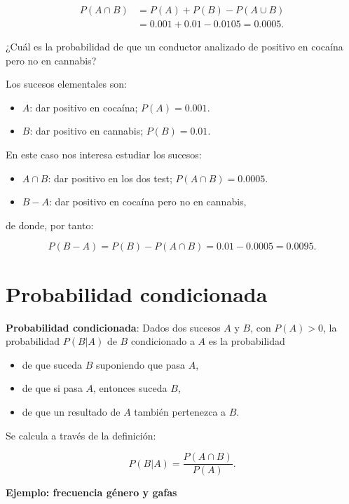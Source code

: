\documentclass[]{book}
\providecommand{\tightlist}{%
  \setlength{\itemsep}{0pt}\setlength{\parskip}{0pt}}
\begin{document}
\[\begin{array}{rl}
{P(A\cap B)} &{=P(A)+P(B)-P(A\cup B)}\\ &{=0.001+0.01-0.0105=0.0005}.
\end{array}\]

¿Cuál es la probabilidad de que un conductor analizado de positivo en cocaína pero no en cannabis?

Los sucesos elementales son:

\begin{itemize}
\tightlist
\item
  \(A\): dar positivo en cocaína; \(P(A)=0.001\).
\item
  \(B\): dar positivo en cannabis; \(P(B)=0.01\).
\end{itemize}

En este caso nos interesa estudiar los sucesos:

\begin{itemize}
\tightlist
\item
  \(A\cap B\): dar positivo en los dos test; \(P(A\cap B)=0.0005\).
\item
  \(B-A\): dar positivo en cocaína pero no en cannabis,
\end{itemize}

de donde, por tanto:

\[P(B-A) =P(B)-P(A\cap B) =0.01-0.0005=0.0095.\]

\hypertarget{probabilidad-condicionada}{%
\section{Probabilidad condicionada}\label{probabilidad-condicionada}}

 \textbf{Probabilidad condicionada}: Dados dos sucesos \(A\) y \(B\), con \(P(A)>0\), la probabilidad \(P(B|A)\) de \(B\) condicionado a \(A\) es la probabilidad

\begin{itemize}
\tightlist
\item
  de que suceda \(B\) suponiendo que pasa \(A\),
\item
  de que si pasa \(A\), entonces suceda \(B\),
\item
  de que un resultado de \(A\) también pertenezca a \(B\).
\end{itemize}

Se calcula a través de la definición:

\[
P(B|A)=\frac{P(A\cap B)}{P(A)}.
\]

\textbf{Ejemplo: frecuencia género y gafas}
\end{document}
